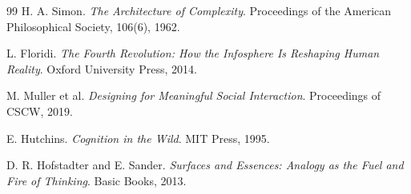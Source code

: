 \documentclass[11pt,oneside]{article}
\begin{document}
\begin{thebibliography}{99}
H. A. Simon.
\newblock \emph{The Architecture of Complexity}.
\newblock Proceedings of the American Philosophical Society, 106(6), 1962.

L. Floridi.
\newblock \emph{The Fourth Revolution: How the Infosphere Is Reshaping Human Reality}.
\newblock Oxford University Press, 2014.

M. Muller et al.
\newblock \emph{Designing for Meaningful Social Interaction}.
\newblock Proceedings of CSCW, 2019.

E. Hutchins.
\newblock \emph{Cognition in the Wild}.
\newblock MIT Press, 1995.

D. R. Hofstadter and E. Sander.
\newblock \emph{Surfaces and Essences: Analogy as the Fuel and Fire of Thinking}.
\newblock Basic Books, 2013.

\end{thebibliography}
\end{document}
